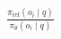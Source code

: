 \documentclass[preview]{standalone}
\begin{document}
\begin{align*}
\frac{\pi_{\text{ref}}(o_i \mid q)}{\pi_\theta(o_i \mid q)}
\end{align*}
\end{document}
